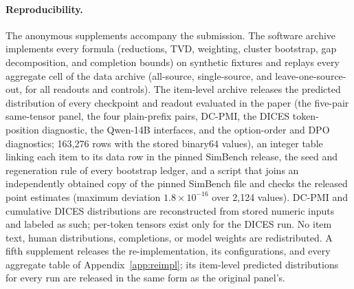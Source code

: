 \documentclass[11pt]{article}
\begin{document}
\paragraph{Reproducibility.}
The anonymous supplements accompany the submission. The software archive
implements every formula (reductions, TVD, weighting, cluster bootstrap, gap
decomposition, and completion bounds) on synthetic fixtures and replays every
aggregate cell of the data archive (all-source, single-source, and
leave-one-source-out, for all readouts and controls). The item-level archive
releases the predicted distribution of every checkpoint and readout evaluated
in the paper (the five-pair same-tensor panel, the four plain-prefix pairs,
DC-PMI, the DICES token-position diagnostic, the Qwen-14B interfaces, and the
option-order and DPO diagnostics; 163,276 rows with the stored binary64
values), an integer table linking each item to its data row in the pinned
SimBench release, the seed and regeneration rule of every bootstrap ledger,
and a script that joins an independently obtained copy of the pinned SimBench
file and checks the released point estimates (maximum deviation
$1.8\times10^{-16}$ over 2,124 values). DC-PMI and cumulative DICES
distributions are reconstructed from stored numeric inputs and labeled as
such; per-token tensors exist only for the DICES run. No item text, human distributions, completions, or model weights are
redistributed. A fifth supplement releases the re-implementation, its
configurations, and every aggregate table of Appendix~\ref{app:reimpl}; its
item-level predicted distributions for every run are released in the same
form as the original panel's.
\end{document}
